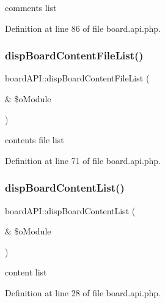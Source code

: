 comments list 



Definition at line 86 of file board.\+api.\+php.

\hypertarget{classboardAPI_a38441526c56c77613bb6681cf5c927d5}{}\label{classboardAPI_a38441526c56c77613bb6681cf5c927d5} 
\subsubsection{\texorpdfstring{disp\+Board\+Content\+File\+List()}{dispBoardContentFileList()}}
{\footnotesize\ttfamily board\+A\+P\+I\+::disp\+Board\+Content\+File\+List (\begin{DoxyParamCaption}\item[{\&}]{\$o\+Module }\end{DoxyParamCaption})}



contents file list 



Definition at line 71 of file board.\+api.\+php.

\hypertarget{classboardAPI_a7002a8159c34d85b969647c04f3baaa3}{}\label{classboardAPI_a7002a8159c34d85b969647c04f3baaa3} 
\subsubsection{\texorpdfstring{disp\+Board\+Content\+List()}{dispBoardContentList()}}
{\footnotesize\ttfamily board\+A\+P\+I\+::disp\+Board\+Content\+List (\begin{DoxyParamCaption}\item[{\&}]{\$o\+Module }\end{DoxyParamCaption})}



content list 



Definition at line 28 of file board.\+api.\+php.

\hypertarget{classboardAPI_aeaa451d5556251f9d148350b34d0481a}{}\label{classboardAPI_aeaa451d5556251f9d148350b34d0481a} 
